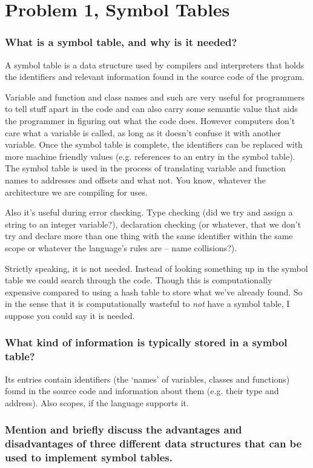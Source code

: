 \section{Problem 1, Symbol Tables}
\subsubsection{What is a symbol table, and why is it needed?}
A symbol table is a data structure used by compilers and interpreters that holds the identifiers and relevant information found in the source code of the program.

Variable and function and class names and such are very useful for programmers to tell stuff apart in the code and can also carry some semantic value that aids the programmer in figuring out what the code does.
However computers don't care what a variable is called, as long as it doesn't confuse it with another variable.
Once the symbol table is complete, the identifiers can be replaced with more machine friendly values (e.g. references to an entry in the symbol table).
The symbol table is used in the process of translating variable and function names to addresses and offsets and what not.
You know, whatever the architecture we are compiling for uses.

Also it's useful during error checking.
Type checking (did we try and assign a string to an integer variable?), declaration checking (or whatever, that we don't try and declare more than one thing with the same identifier within the same scope or whatever the language's rules are -- name collisions?).

Strictly speaking, it is not needed.
Instead of looking something up in the symbol table we could search through the code.
Though this is computationally expensive compared to using a hash table to store what we've already found.
So in the sense that it is computationally wasteful to \emph{not} have a symbol table, I suppose you could say it is needed.


\subsubsection{What kind of information is typically stored in a symbol table?}
Its entries contain identifiers (the `names' of variables, classes and functions) found in the source code and information about them (e.g. their type and address).
Also scopes, if the language supports it.

\subsubsection{Mention and briefly discuss the advantages and disadvantages of three different data structures that can be used to implement symbol tables.}
